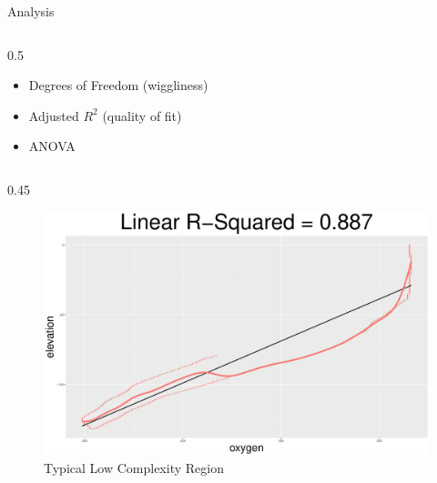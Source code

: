 \documentclass[final]{beamer}
\newlength{\colwidth}
\begin{document}
\begin{frame}[t]
\begin{columns}[t]
\begin{column}{\colwidth}
\begin{block}{Analysis}
\begin{columns}[t]
      \begin{column}{0.5 \colwidth}
    \vspace{-30pt}
      \begin{itemize}
    \vspace{-15pt}
          \item Degrees of Freedom (wiggliness) 
          \item Adjusted $R^2$ (quality of fit) 
          \item ANOVA
      \end{itemize}
      \end{column}
      
  \end{columns}

\vspace{10pt}
  
  \begin{columns}[t]
    \begin{column}{0.45 \colwidth}
    \begin{figure}
        \centering
      \includegraphics[width= \textwidth]{Figures/high_linear_R2.pdf}    
      \vspace{-60pt}
        \caption{Typical Low Complexity Region}
    \end{figure}
    \end{column}



\end{columns}
\end{block}
\end{column}
\end{columns}
\end{frame}
\end{document}
